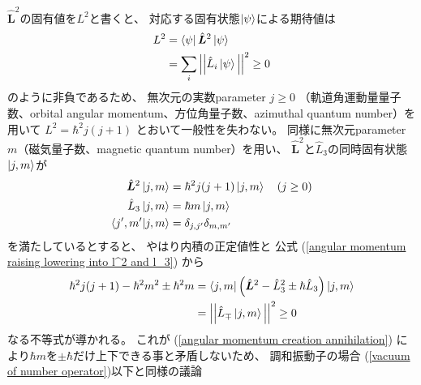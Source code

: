 $\hat{\bm{L}}^2$の固有値を$L^2$と書くと、
対応する固有状態$\ket{\psi}$による期待値は
\begin{align}
    L^2
&=
    \bra{\psi} \hat{\bm{L}}^2 \ket{\psi}
\notag\\&=
    \sum_i
    \Big|\Big|
        \hat{L}_i \ket{\psi}
    \Big|\Big|^2 \ge 0
\end{align}
のように非負であるため、
無次元の実数parameter $j \ge 0$
（軌道角運動量量子数、orbital angular momentum、方位角量子数、azimuthal quantum number）を用いて
$L^2 = \hbar^2 j (j+1)$
とおいて一般性を失わない。
同様に無次元parameter $m$（磁気量子数、magnetic quantum number）を用い、
$\hat{\bm{L}}^2$と$\hat{L}_3$の同時固有状態$\ket{j,m}$が
\begin{subequations}
\begin{align}
    \hat{\bm{L}}^2 \ket{j,m}
    &=
    \hbar^2 j (j+1) \ket{j,m}
    \quad( j \ge 0 )
\\
    \hat{L}_3 \ket{j,m}
    &=
    \hbar m \ket{j,m}
\\
    \braket{ j', m' | j, m }
    &=
    \delta_{j, j'} \delta_{m, m'}
\end{align}
\end{subequations}
を満たしているとすると、
やはり内積の正定値性と
公式
(\ref{angular momentum raising lowering into l^2 and l_3})
から
\begin{align}
    \hbar^2 j (j+1)
-
    \hbar^2 m^2
\pm \hbar^2 m
&=
    \bra{ j, m } \left(
        \hat{\bm{L}}^2
        -
        \hat{L}_3^2
        \pm \hbar
        \hat{L}_3
    \right)\ket{ j, m }
\notag\\&=
    \Big|\Big|
        \hat{L}_\mp \ket{ j, m }
    \Big|\Big|^2
\ge
    0
\end{align}
なる不等式が導かれる。
これが
(\ref{angular momentum creation annihilation})
により$\hbar m$を$\pm \hbar$だけ上下できる事と矛盾しないため、
調和振動子の場合
(\ref{vacuum of number operator})以下と同様の議論
